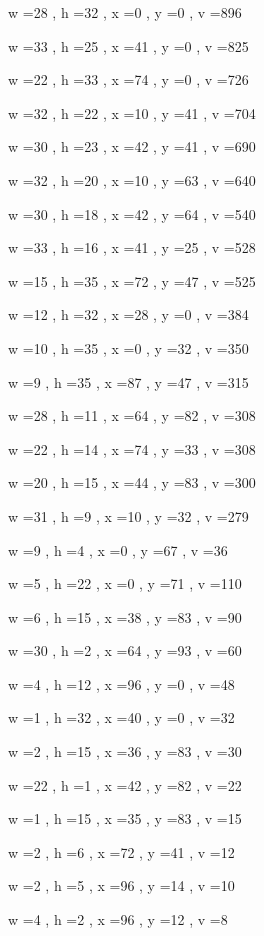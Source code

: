\documentclass[11pt]{article}
\begin{document}
w =28 , h =32 , x =0 , y =0 , v =896
\par
w =33 , h =25 , x =41 , y =0 , v =825
\par
w =22 , h =33 , x =74 , y =0 , v =726
\par
w =32 , h =22 , x =10 , y =41 , v =704
\par
w =30 , h =23 , x =42 , y =41 , v =690
\par
w =32 , h =20 , x =10 , y =63 , v =640
\par
w =30 , h =18 , x =42 , y =64 , v =540
\par
w =33 , h =16 , x =41 , y =25 , v =528
\par
w =15 , h =35 , x =72 , y =47 , v =525
\par
w =12 , h =32 , x =28 , y =0 , v =384
\par
w =10 , h =35 , x =0 , y =32 , v =350
\par
w =9 , h =35 , x =87 , y =47 , v =315
\par
w =28 , h =11 , x =64 , y =82 , v =308
\par
w =22 , h =14 , x =74 , y =33 , v =308
\par
w =20 , h =15 , x =44 , y =83 , v =300
\par
w =31 , h =9 , x =10 , y =32 , v =279
\par
w =9 , h =4 , x =0 , y =67 , v =36
\par
w =5 , h =22 , x =0 , y =71 , v =110
\par
w =6 , h =15 , x =38 , y =83 , v =90
\par
w =30 , h =2 , x =64 , y =93 , v =60
\par
w =4 , h =12 , x =96 , y =0 , v =48
\par
w =1 , h =32 , x =40 , y =0 , v =32
\par
w =2 , h =15 , x =36 , y =83 , v =30
\par
w =22 , h =1 , x =42 , y =82 , v =22
\par
w =1 , h =15 , x =35 , y =83 , v =15
\par
w =2 , h =6 , x =72 , y =41 , v =12
\par
w =2 , h =5 , x =96 , y =14 , v =10
\par
w =4 , h =2 , x =96 , y =12 , v =8
\par
\newpage
\end{document}
